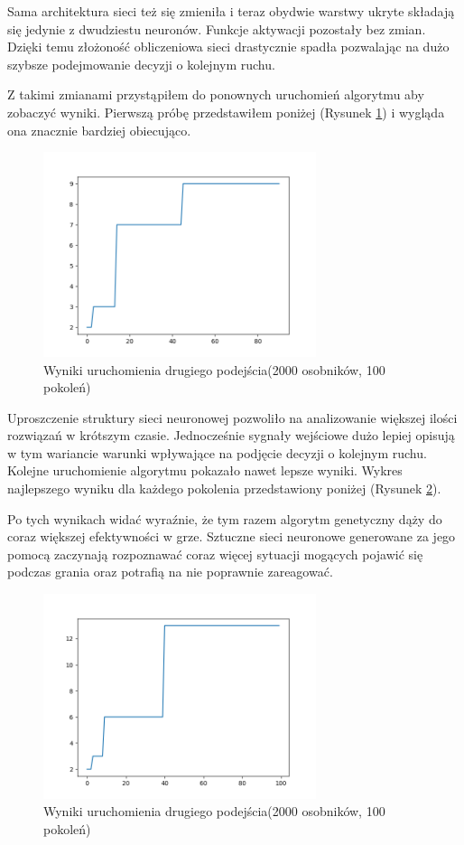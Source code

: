 \documentclass[12pt, oneside, a4paper]{report}
\begin{document}
Sama architektura sieci też się zmieniła i teraz obydwie warstwy ukryte składają się jedynie z dwudziestu neuronów. Funkcje aktywacji pozostały bez zmian. Dzięki temu złożoność obliczeniowa sieci drastycznie spadła pozwalając na dużo szybsze podejmowanie decyzji o kolejnym ruchu.

Z takimi zmianami przystąpiłem do ponownych uruchomień algorytmu aby zobaczyć wyniki. Pierwszą próbę przedstawiłem poniżej (Rysunek \ref{fig: 4.3}) i wygląda ona znacznie bardziej obiecująco.

\begin{figure}[h]
	\centering
	\includegraphics[width=8cm]{fig43.png}
	\caption{Wyniki uruchomienia drugiego podejścia(2000 osobników, 100 pokoleń) }
	\label{fig: 4.3}
\end{figure}

Uproszczenie struktury sieci neuronowej pozwoliło na analizowanie większej ilości rozwiązań w krótszym czasie. Jednocześnie sygnały wejściowe dużo lepiej opisują w tym wariancie warunki wpływające na podjęcie decyzji o kolejnym ruchu. Kolejne uruchomienie algorytmu pokazało nawet lepsze wyniki. Wykres najlepszego wyniku dla każdego pokolenia przedstawiony poniżej (Rysunek \ref{fig: 4.4}).

Po tych wynikach widać wyraźnie, że tym razem algorytm genetyczny dąży do coraz większej efektywności w grze. Sztuczne sieci neuronowe generowane za jego pomocą zaczynają rozpoznawać coraz więcej sytuacji mogących pojawić się podczas grania oraz potrafią na nie poprawnie zareagować.

\begin{figure}[h]
	\centering
	\includegraphics[width=8cm]{fig44.png}
	\caption{Wyniki uruchomienia drugiego podejścia(2000 osobników, 100 pokoleń) }
	\label{fig: 4.4}
\end{figure}
 
\end{document}
